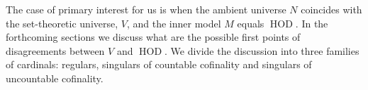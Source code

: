 \documentclass[11pt]{amsart}
\newtheorem{proposition}[theorem]{Proposition}
\theoremstyle{definition}
\theoremstyle{remark}
\DeclareMathOperator{\crit}{crit}
\DeclareMathOperator{\HOD}{HOD}
\newcommand\ale[1]{\marginpar{Alejandro: #1}}
\begin{document}

The case of primary interest for us is when the ambient universe $N$ coincides with the set-theoretic universe, $V$, and the inner model $M$ equals $\HOD$.  In the forthcoming sections we discuss what are the possible first points of disagreements between $V$ and $\HOD$. We divide the discussion into three families of cardinals: regulars, singulars of countable cofinality and singulars of uncountable cofinality.
\end{document}
